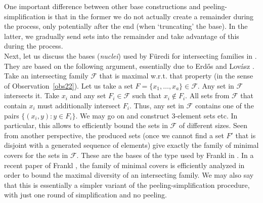 \documentclass[graybox]{svmult}
\newcommand{\ff}{\mathcal{F}}
\begin{document}
One important difference between other base constructions and peeling-simplification is that in the former we do not actually create a remainder during the process, only potentially after the end (when `truncating' the base). In the latter, we gradually send sets into the remainder and take advantage of this during the process.\\


Next, let us discuss the bases ({\it nuclei}) used by F\"uredi for intersecting families in \cite{Fur78}. They are based on the following argument, essentially due to Erd\H os and Lov\'asz \cite{EL}. Take an intersecting family $\ff$ that is maximal w.r.t. that property (in the sense of Observation~\ref{obs22}). Let us take a set $F=\{x_1,\ldots, x_a\}\in \ff$. Any set in $\ff$ intersects it. Take $x_i$ and any set $F_i\in \ff$ such that $x_i\notin F_i$. All sets from $\ff$ that contain $x_i$ must additionally intersect $F_i$. Thus, any set in $\ff$ contains one of the pairs $\{(x_i, y): y\in F_i\}$. We may go on and construct $3$-element sets etc. In particular, this allows to efficiently bound the sets in $\ff$ of different sizes. Seen from another perspective, the produced sets (once we cannot find a set $F'$ that is disjoint with a generated sequence of elements) give exactly the family of minimal covers for the sets in $\ff$. These are the bases of the type used by Frankl in \cite{Fra2}. In a recent paper of Frankl \cite{Fra17}, the family of minimal covers is efficiently analyzed in order to bound the maximal diversity of an intersecting family. We may also say that this is essentially a simpler variant of the peeling-simplification procedure, with just one round of simplification and no peeling.
\end{document}
